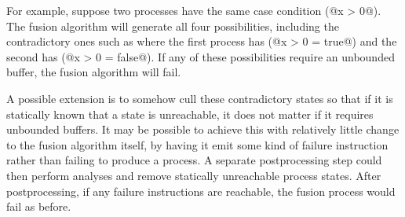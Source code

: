 For example, suppose two processes have the same case condition (@x > 0@).
The fusion algorithm will generate all four possibilities, including the contradictory ones such as where the first process has (@x > 0 = true@) and the second has (@x > 0 = false@).
If any of these possibilities require an unbounded buffer, the fusion algorithm will fail.

A possible extension is to somehow cull these contradictory states so that if it is statically known that a state is unreachable, it does not matter if it requires unbounded buffers.
It may be possible to achieve this with relatively little change to the fusion algorithm itself, by having it emit some kind of failure instruction rather than failing to produce a process.
A separate postprocessing step could then perform analyses and remove statically unreachable process states.
After postprocessing, if any failure instructions are reachable, the fusion process would fail as before.



